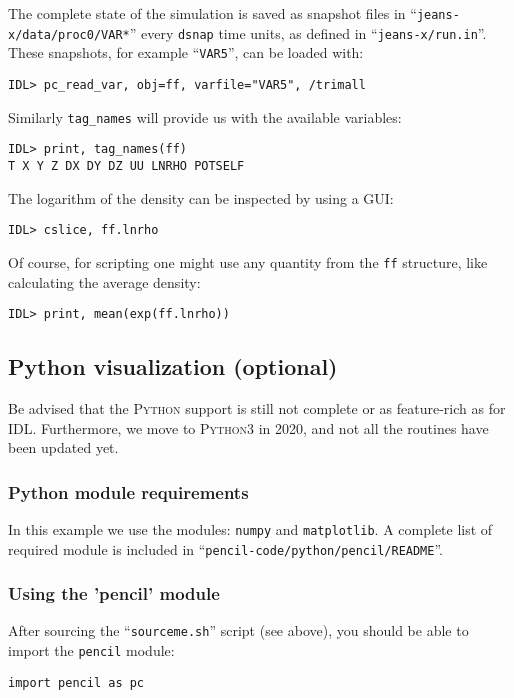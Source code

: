 \documentclass[a4paper,12pt]{article}
\newcommand{\file}[1]{``\texttt{#1}''}
\newcommand{\name}[1]{\textsc{#1}}
\newcommand{\code}[1]{\texttt{#1}}
\begin{document}
The complete state of the simulation is saved as snapshot files in
\file{jeans-x/data/proc0/VAR*} every \code{dsnap} time units,
as defined in \file{jeans-x/run.in}.
These snapshots, for example \file{VAR5}, can be loaded with:
\begin{verbatim}
IDL> pc_read_var, obj=ff, varfile="VAR5", /trimall
\end{verbatim}

Similarly \code{tag\_names} will provide us with the available variables:
\begin{verbatim}
IDL> print, tag_names(ff)
T X Y Z DX DY DZ UU LNRHO POTSELF
\end{verbatim}

The logarithm of the density can be inspected by using a GUI:
\begin{verbatim}
IDL> cslice, ff.lnrho
\end{verbatim}

Of course, for scripting one might use any quantity from the \code{ff} structure, like calculating the average density:
\begin{verbatim}
IDL> print, mean(exp(ff.lnrho))
\end{verbatim}


\subsection{Python visualization (optional)}
Be advised that the \name{Python} support is still not complete or as feature-rich as for \name{IDL}.
Furthermore, we move to \name{Python3} in 2020, and not all the routines have 
been updated yet.

\subsubsection{Python module requirements}
 

In this example we use the modules: \code{numpy} and \code{matplotlib}.
A complete list of required module is included in 
\file{pencil-code/python/pencil/README}.


\subsubsection{Using the 'pencil' module}
After sourcing the \file{sourceme.sh} script (see above), you should be able to import the \code{pencil} module:

\begin{verbatim}
import pencil as pc
\end{verbatim}
\end{document}
